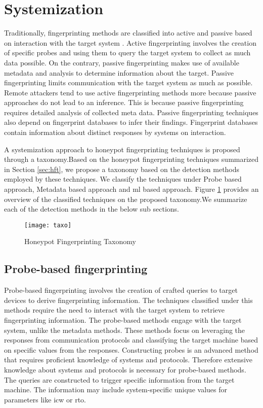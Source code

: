 \section{Systemization}
\label{sec:taxonomy}

 Traditionally, fingerprinting methods are classified into active and passive based on interaction with the target system \cite{spitzner}. Active fingerprinting involves the creation of specific probes and using them to query the target system to collect as much data possible. On the contrary, passive fingerprinting makes use of available metadata and analysis to determine information about the target. Passive fingerprinting limits communication with the target system as much as possible. Remote attackers tend to use active fingerprinting methods more because passive approaches do not lead to an inference. This is because passive fingerprinting requires detailed analysis of collected meta data. Passive fingerprinting techniques also depend on fingerprint databases to infer their findings. Fingerprint databases contain information about distinct responses by systems on interaction.
   
A systemization approach to honeypot fingerprinting techniques is proposed through a taxonomy.Based on the honeypot fingerprinting techniques summarized in Section \ref{sec:hft}, we propose a taxonomy based on the detection methods employed by these techniques. We classify the techniques under Probe based approach, Metadata based approach and \acrlong{ml} based approach. Figure \ref{fig:taxonomy} provides an overview of the classified techniques on the proposed taxonomy.We summarize each of the detection methods in the below sub sections. 

\begin{figure}[t]
    \centering
    \texttt{[image: taxo]}
    \caption{Honeypot Fingerprinting Taxonomy}
    \label{fig:taxonomy}
\end{figure}

\subsection{Probe-based fingerprinting}
\label{Probe Based}
Probe-based fingerprinting involves the creation of crafted queries to target devices to derive fingerprinting information. The techniques classified under this methods require the need to interact with the target system to retrieve fingerprinting information. The probe-based methods engage with the target system, unlike the metadata methods. These methods focus on leveraging the responses from communication protocols and classifying the target machine based on specific values from the responses. Constructing probes is an advanced method that requires proficient knowledge of systems and protocols. Therefore extensive knowledge about systems and protocols is necessary for probe-based methods. The queries are constructed to trigger specific information from the target machine. The information may include system-specific unique values for parameters like \acrfull{icw} or \acrfull{rto}. 

